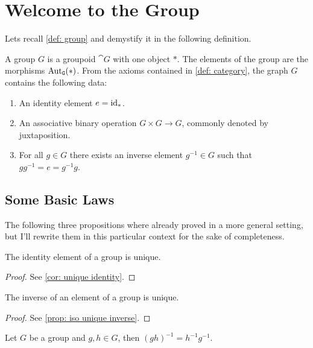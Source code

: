 \section{Welcome to the Group}

Lets recall \cref{def: group} and demystify it in the following definition.

\begin{definition}[Group]
    A group \(G\) is a groupoid \(\cat G\) with one object \(*\). The elements of
    the group are the morphisms \(\operatorname{Aut}_{\texttt G}(*)\). From the axioms contained in
    \cref{def: category}, the graph \(G\) contains the following data:
    \begin{enumerate}[(G1)]
        \item An identity element \(e = \operatorname{id}_*\).
        \item An associative binary operation \(G \times G \to G\), commonly denoted
              by juxtaposition.
        \item For all \(g \in G\) there exists an inverse element \(g^{-1} \in G\)
              such that \(g g^{-1} = e = g^{-1} g\).
    \end{enumerate}
\end{definition}

\subsection{Some Basic Laws}

The following three propositions where already proved in a more general setting,
but I'll rewrite them in this particular context for the sake of completeness.

\begin{proposition}
    The identity element of a group is unique.
\end{proposition}

\begin{proof}
    See \cref{cor: unique identity}.
\end{proof}

\begin{proposition}
    The inverse of an element of a group is unique.
\end{proposition}

\begin{proof}
    See \cref{prop: iso unique inverse}.
\end{proof}

\begin{proposition}
    Let \(G\) be a group and \(g, h \in G\), then \((g h)^{-1} = h^{-1} g^{-1}\).
\end{proposition}

